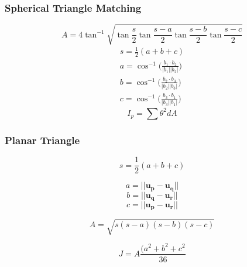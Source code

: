 \documentclass[12pt,a4paper,oneside]{article}
\begin{document}
\subsubsection{Spherical Triangle Matching}
\cite{cole2004fast}

\begin{equation}
A = 4\tan^{-1}\sqrt{\tan\frac{s}{2}\tan\frac{s-a}{2}\tan\frac{s-b}{2}\tan\frac{s-c}{2}}
\end{equation}
\begin{subequations}
\begin{align*}
s = \frac{1}{2}(a + b + c) \\
a = \cos^{-1} \bigg(\frac{b_1 \cdot b_2}{|b_1||b_2|}\bigg) \\
b = \cos^{-1} \bigg(\frac{b_2 \cdot b_3}{|b_2||b_3|}\bigg) \\
c = \cos^{-1} \bigg(\frac{b_3 \cdot b_1}{|b_3||b_1|}\bigg) 
\end{align*}
\end{subequations}
\begin{equation}
I_p = \sum\theta^2dA
\end{equation}
\subsubsection{Planar Triangle}
\cite{cole2006fast}\par

\begin{equation}
s = \frac{1}{2}(a + b + c)
\end{equation}

\begin{equation}
a = ||\bm{u_p} - \bm{u_q}||
\end{equation}
\begin{equation}
b = ||\bm{u_q} - \bm{u_r}||
\end{equation}
\begin{equation}
c = ||\bm{u_p} - \bm{u_r}||
\end{equation}

\begin{equation}
A = \sqrt{s(s-a)(s-b)(s-c)}
\end{equation}

\begin{equation}
J = A\frac{(a^2 + b^2 + c^2}{36}
\end{equation}
\end{document}
